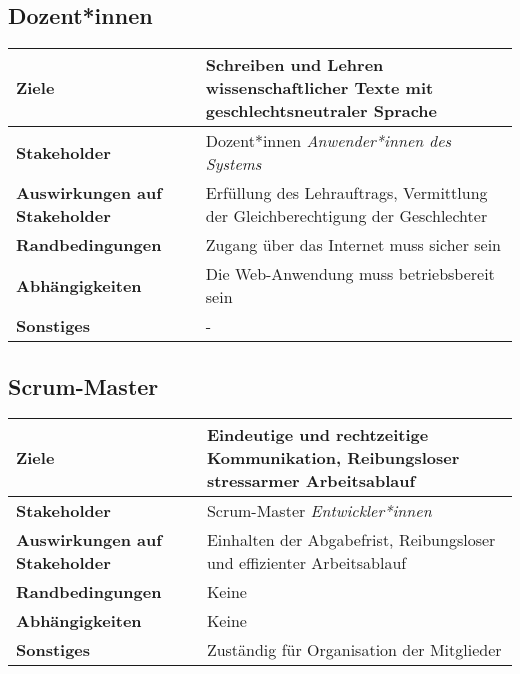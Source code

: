 \documentclass[paper=a4, parskip=half]{scrreprt}
\begin{document}
\subsection{Dozent*innen}
\begin{tabular}
	{
	|p{}
	|p{}
	|
	}
	\hline
	\textbf{Ziele}
	&Schreiben und Lehren wissenschaftlicher Texte mit geschlechtsneutraler Sprache\\
	\hline
	\textbf{Stakeholder}
	&Dozent*innen
	\newline \textit{Anwender*innen des Systems}\\
	\hline
	\textbf{Auswirkungen auf Stakeholder}
	&Erfüllung des Lehrauftrags, Vermittlung der Gleichberechtigung der Geschlechter\\
	\hline
	\textbf{Randbedingungen}
	&Zugang über das Internet muss sicher sein\\
	\hline
	\textbf{Abhängigkeiten}
	&Die Web-Anwendung muss betriebsbereit sein\\
	\hline
	\textbf{Sonstiges}
	&-\\
	\hline
\end{tabular}

\subsection{Scrum-Master}
\begin{tabular}
	{
	|p{}
	|p{}
	|
	}
	\hline
	\textbf{Ziele}
	&Eindeutige und rechtzeitige Kommunikation, Reibungsloser stressarmer Arbeitsablauf\\
	\hline
	\textbf{Stakeholder}
	&Scrum-Master
	\newline \textit{Entwickler*innen}\\
	\hline
	\textbf{Auswirkungen auf Stakeholder}
	&Einhalten der Abgabefrist, Reibungsloser und effizienter Arbeitsablauf\\
	\hline
	\textbf{Randbedingungen}
	&Keine\\
	\hline
	\textbf{Abhängigkeiten}
	&Keine\\
	\hline
	\textbf{Sonstiges}
	&Zuständig für Organisation der Mitglieder\\
	\hline
\end{tabular}
\end{document}

